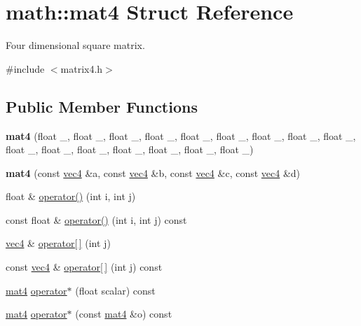 \hypertarget{structmath_1_1mat4}{}\section{math\+:\+:mat4 Struct Reference}
\label{structmath_1_1mat4}


Four dimensional square matrix.  




{\ttfamily \#include $<$matrix4.\+h$>$}

\subsection*{Public Member Functions}
\begin{DoxyCompactItemize}
\item 
\mbox{\label{structmath_1_1mat4_af63595005ccac0f4cc9f9b9c100c3902}} 
{\bfseries mat4} (float \+\_, float \+\_, float \+\_, float \+\_, float \+\_, float \+\_, float \+\_, float \+\_, float \+\_, float \+\_, float \+\_, float \+\_, float \+\_, float \+\_, float \+\_, float \+\_)
\item 
\mbox{\label{structmath_1_1mat4_a7edc1633dcdbe66084d5556e938e2621}} 
{\bfseries mat4} (const \hyperlink{structmath_1_1vec4}{vec4} \&a, const \hyperlink{structmath_1_1vec4}{vec4} \&b, const \hyperlink{structmath_1_1vec4}{vec4} \&c, const \hyperlink{structmath_1_1vec4}{vec4} \&d)
\item 
float \& \hyperlink{structmath_1_1mat4_a62ba6a0b72f251fbbdb6b4d1941660bb}{operator()} (int i, int j)
\item 
const float \& \hyperlink{structmath_1_1mat4_a920c9499848225190aba4add2cba66bf}{operator()} (int i, int j) const
\item 
\hyperlink{structmath_1_1vec4}{vec4} \& \hyperlink{structmath_1_1mat4_af1174463f36d030f31ba088c510e86d5}{operator\mbox{[}$\,$\mbox{]}} (int j)
\item 
const \hyperlink{structmath_1_1vec4}{vec4} \& \hyperlink{structmath_1_1mat4_a7206a569f87bd24ee5a851899cf8c5c8}{operator\mbox{[}$\,$\mbox{]}} (int j) const
\item 
\hyperlink{structmath_1_1mat4}{mat4} \hyperlink{structmath_1_1mat4_a26e1decc5a95dfa924dfc2fdce10a8ec}{operator$\ast$} (float scalar) const
\item 
\hyperlink{structmath_1_1mat4}{mat4} \hyperlink{structmath_1_1mat4_a073575764764cf2eff9e3bc1f2740cf5}{operator$\ast$} (const \hyperlink{structmath_1_1mat4}{mat4} \&o) const

\end{DoxyCompactItemize}
